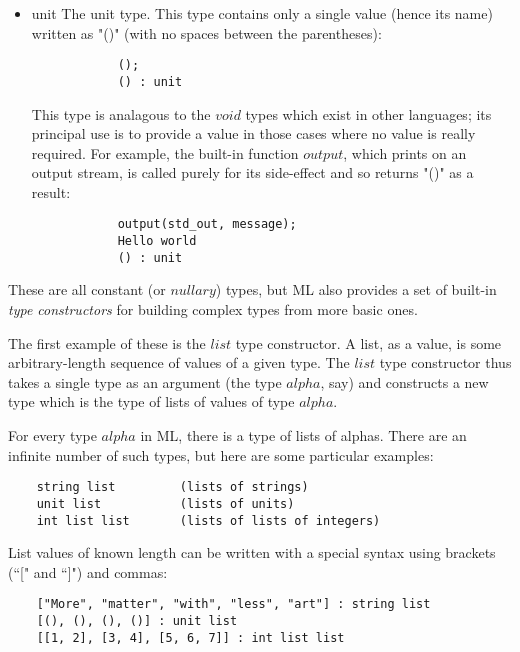 \begin{itemize}
        Built-in predicates such as ``=" (general equality) and ``$<$"
        (less-than ordering) return values of this type, and there is a
        conditional expression form which can choose between alternative
        values based on a boolean test. For example:
\begin{verbatim}
            if x = y then "yes" else "no";
            "no" : string
\end{verbatim}

\item    unit
        The unit type. This type contains only a single value (hence its
        name) written as "()" (with no spaces between the parentheses):
\begin{verbatim}
            ();
            () : unit
\end{verbatim}

        This type is analagous to the $void$ types which exist in other
        languages; its principal use is to provide a value in those cases
        where no value is really required. For example, the built-in
        function $output$, which prints on an output stream, is called
        purely for its side-effect and so returns "()" as a result:
\begin{verbatim}
            output(std_out, message);
            Hello world
            () : unit
\end{verbatim}

\end{itemize}

These are all constant (or $nullary$) types, but ML also provides a set
of built-in {\em type constructors} for building complex types from more
basic ones.

The first example of these is the $list$ type constructor. A list, as a
value, is some arbitrary-length sequence of values of a given type. The
$list$ type constructor thus takes a single type as an argument (the
type $alpha$, say) and constructs a new type which is the type of lists
of values of type $alpha$.

For every type $alpha$ in ML, there is a type of lists of alphas. There
are an infinite number of such types, but here are some particular
examples:
\begin{verbatim}
    string list         (lists of strings)
    unit list           (lists of units)
    int list list       (lists of lists of integers)
\end{verbatim}

List values of known length can be written with a special syntax using
brackets (``[" and ``]") and commas:
\begin{verbatim}
    ["More", "matter", "with", "less", "art"] : string list
    [(), (), (), ()] : unit list
    [[1, 2], [3, 4], [5, 6, 7]] : int list list
\end{verbatim}

